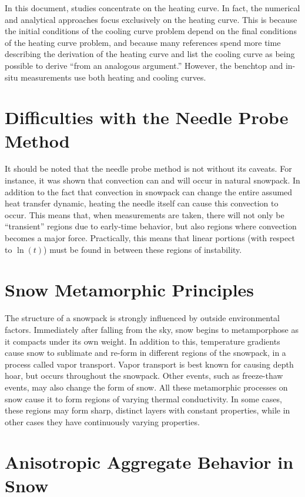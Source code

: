 In this document, studies concentrate on the heating curve. In fact, the
numerical and analytical approaches focus exclusively on the heating curve. This
is because the initial conditions of the cooling curve problem depend on the
final conditions of the heating curve problem, and because many references spend
more time describing the derivation of the heating curve and list the cooling
curve as being possible to derive ``from an analogous argument.'' However, the
benchtop and in-situ measurements use both heating and cooling curves.

\section{Difficulties with the Needle Probe Method}

It should be noted that the needle probe method is not without its caveats. For
instance, it was shown that convection can and will occur in natural snowpack.
\cite{sturm3} In addition to the fact that convection in snowpack can change the
entire assumed heat transfer dynamic, heating the needle itself can cause this
convection to occur. This means that, when measurements are taken, there will
not only be ``transient'' regions due to early-time behavior, but also regions
where convection becomes a major force. Practically, this means that linear
portions (with respect to \(\ln(t)\)) must be found in between these regions
of instability.

\section{Snow Metamorphic Principles}
\label{sec:introduction:metamorphic}

The structure of a snowpack is strongly influenced by outside environmental
factors. Immediately after falling from the sky, snow begins to metamporphose as
it compacts under its own weight. In addition to this, temperature gradients
cause snow to sublimate and re-form in different regions of the snowpack, in a
process called vapor transport. Vapor transport is best known for causing
depth hoar, but occurs throughout the snowpack. Other events, such as
freeze-thaw events, may also change the form of snow. All these metamorphic
processes on snow cause it to form regions of varying thermal conductivity. In
some cases, these regions may form sharp, distinct layers with constant
properties, while in other cases they have continuously varying properties.

\section{Anisotropic Aggregate Behavior in Snow}

